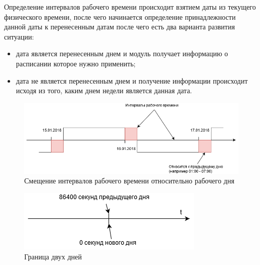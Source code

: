 \indent Определение интервалов рабочего времени происходит взятием даты из текущего физического времени, после чего начинается определение принадлежности данной даты к перенесенным датам после чего есть два варианта развития ситуации:

\begin{itemize}
	\item дата является перенесенным днем и модуль получает информацию о расписании которое нужно применить;
	\item дата не является перенесенным днем и получение информации происходит исходя из того, каким днем недели является данная дата.
\end{itemize}

\begin{figure}[ht]
	\centering
	\includegraphics[width=\linewidth]{pics/scheduleIntervals.png}
	\caption{Смещение интервалов рабочего времени относительно рабочего дня}
	\label{fig:intervals}
\end{figure}

\begin{figure}[ht]
	\centering
	\includegraphics[width=0.6\linewidth]{pics/scheduleTime.png}
	\caption{Граница двух дней}
	\label{fig:time}
\end{figure}

